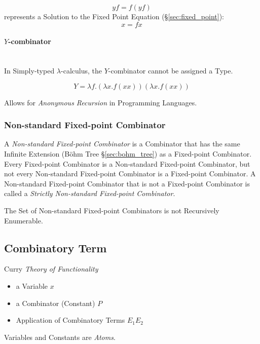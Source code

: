 \[
  y f = f (y f)
\]
represents a Solution to the Fixed Point Equation
(\S\ref{sec:fixed_point}):
\[
  x = f x
\]



\paragraph{$Y$-combinator}\label{sec:y_combinator}
\hfill \\

In Simply-typed $\lambda$-calculus, the $Y$-combinator cannot be
assigned a Type.

\[
  Y = \lambda f.(\lambda x.f (x x)) (\lambda x.f (x x))
\]

Allows for \emph{Anonymous Recursion} in Programming Languages.



\subsubsection{Non-standard Fixed-point Combinator}
\label{sec:nonstandard_combinator}

A \emph{Non-standard Fixed-point Combinator} is a Combinator that has
the same Infinite Extension (B\"ohm Tree \S\ref{sec:bohm_tree}) as a
Fixed-point Combinator. Every Fixed-point Combinator is a Non-standard
Fixed-point Combinator, but not every Non-standard Fixed-point
Combinator is a Fixed-point Combinator. A Non-standard Fixed-point
Combinator that is not a Fixed-point Combinator is called a
\emph{Strictly Non-standard Fixed-point Combinator}.

The Set of Non-standard Fixed-point Combinators is not Recursively
Enumerable. \cite{goldberg05}



\subsection{Combinatory Term}\label{sec:combinatory_term}

Curry \emph{Theory of Functionality}

\begin{itemize}
  \item a Variable $x$
  \item a Combinator (Constant) $P$
  \item Application of Combinatory Terms $E_1 E_2$
\end{itemize}
Variables and Constants are \emph{Atoms}.



